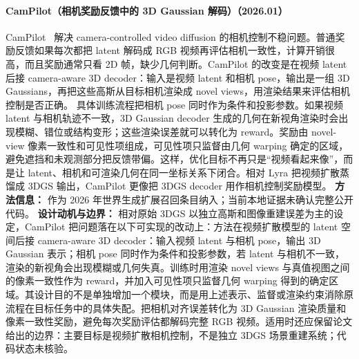 \paragraph{CamPilot（相机奖励反馈中的 3D Gaussian 解码）（2026.01）}
CamPilot~\cite{2601_16214} 解决 camera-controlled video diffusion 的相机控制不稳问题。普通奖励反馈如果每次都把 latent 解码成 RGB 视频再评估相机一致性，计算开销很高，而且奖励通常只看 2D 帧，缺少几何判断。CamPilot 的改变是在视频 latent 后接 camera-aware 3D decoder：输入是视频 latent 和相机 pose，输出是一组 3D Gaussians，再把这些高斯从目标相机渲染成 novel views，用渲染结果来评估相机控制是否正确。
具体训练流程把相机 pose 同时作为条件和投影参数。如果视频 latent 与相机轨迹不一致，3D Gaussian decoder 生成的几何在新视角渲染时会出现模糊、错位或结构变形；这些渲染误差就可以转化为 reward。奖励由 novel-view 像素一致性和可见性项组成，可见性项只监督由几何 warping 确定的区域，避免遮挡和未观测部分把反馈带偏。这样，优化目标不再只是“视频看起来像”，而是让 latent、相机和可渲染几何在同一坐标关系下闭合。相对 Lyra 把视频扩散蒸馏成 3DGS 输出，CamPilot 更像把 3DGS decoder 用作相机控制奖励模型。
\textbf{方法信息：} 作为 2026 年世界生成扩展召回条目纳入；当前本地证据未确认完整公开代码。
\textbf{设计动机与边界：} 相对原始 3DGS 以独立高斯和图像重建误差为主的设定，CamPilot 把问题落在以下可实现的改动上：方法在视频扩散模型的 latent 空间后接 camera-aware 3D decoder：输入视频 latent 与相机 pose，输出 3D Gaussian 表示；相机 pose 同时作为条件和投影参数，若 latent 与相机不一致，渲染的新视角会出现模糊或几何失真。训练时用渲染 novel views 与真值视图之间的像素一致性作为 reward，并加入可见性项只监督几何 warping 得到的确定区域。其设计目的不是单独增加一个模块，而是用上述表示、监督或渲染约束消除原流程在目标任务中的具体失配。把相机对齐误差转化为 3D Gaussian 渲染质量和像素一致性奖励，避免每次奖励评估都解码完整 RGB 视频。适用时还应保留论文给出的边界：主要目标是视频扩散相机控制，不是独立 3DGS 场景重建系统；代码状态未核验。
